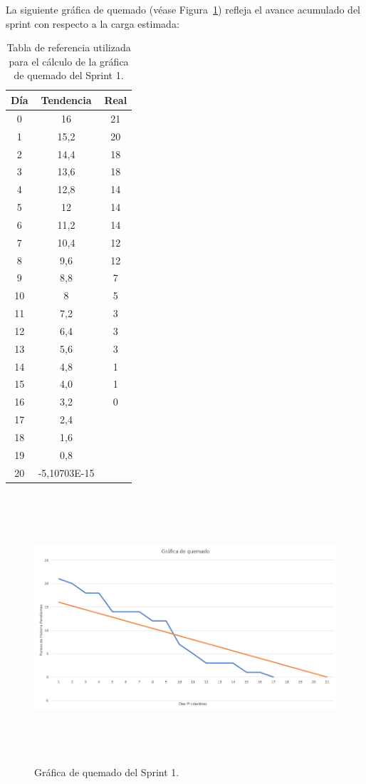 \bigskip

La siguiente gráfica de quemado (véase Figura~\ref{fig:grafica_quemado}) refleja el avance acumulado del sprint con respecto a la carga estimada:

\begin{table}[H]
\centering
\begin{tabular}{|c|c|c|}
\hline
\textbf{Día} & \textbf{Tendencia} & \textbf{Real} \\ \hline
0  & 16   & 21 \\ \hline
1  & 15,2 & 20 \\ \hline
2  & 14,4 & 18 \\ \hline
3  & 13,6 & 18 \\ \hline
4  & 12,8 & 14 \\ \hline
5  & 12   & 14 \\ \hline
6  & 11,2 & 14 \\ \hline
7  & 10,4 & 12 \\ \hline
8  & 9,6  & 12 \\ \hline
9  & 8,8  & 7  \\ \hline
10 & 8    & 5  \\ \hline
11 & 7,2  & 3  \\ \hline
12 & 6,4  & 3  \\ \hline
13 & 5,6  & 3  \\ \hline
14 & 4,8  & 1  \\ \hline
15 & 4,0  & 1  \\ \hline
16 & 3,2  & 0  \\ \hline
17 & 2,4  &    \\ \hline
18 & 1,6  &    \\ \hline
19 & 0,8  &    \\ \hline
20 & -5,10703E-15 & \\ \hline
\end{tabular}
\caption{Tabla de referencia utilizada para el cálculo de la gráfica de quemado del Sprint 1.}
\end{table}

\begin{figure}[H]
  \centering
    \includegraphics[height=10cm, width=15cm]{project/images/grafica.jpg}
  \caption{Gráfica de quemado del Sprint 1.}
  \label{fig:grafica_quemado}
\end{figure}

